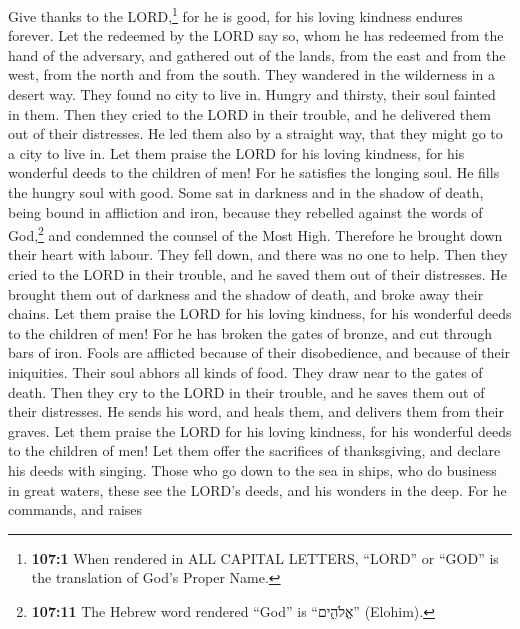  Give thanks to the LORD,\footnote{\textbf{107:1} When
  rendered in ALL CAPITAL LETTERS, ``LORD'' or ``GOD'' is the
  translation of God's Proper Name.} for he is good, for his loving
kindness endures forever.  Let the redeemed by the LORD
say so, whom he has redeemed from the hand of the adversary,
 and gathered out of the lands, from the east and from the
west, from the north and from the south.  They wandered in
the wilderness in a desert way. They found no city to live in.
 Hungry and thirsty, their soul fainted in them.
 Then they cried to the LORD in their trouble, and he
delivered them out of their distresses.  He led them also
by a straight way, that they might go to a city to live in.
 Let them praise the LORD for his loving kindness, for his
wonderful deeds to the children of men!  For he satisfies
the longing soul. He fills the hungry soul with good. 
Some sat in darkness and in the shadow of death, being bound in
affliction and iron,  because they rebelled against the
words of God,\footnote{\textbf{107:11} The Hebrew word rendered ``God''
  is ``אֱלֹהִ֑ים'' (Elohim).} and condemned the counsel of the Most
High.  Therefore he brought down their heart with labour.
They fell down, and there was no one to help.  Then they
cried to the LORD in their trouble, and he saved them out of their
distresses.  He brought them out of darkness and the
shadow of death, and broke away their chains.  Let them
praise the LORD for his loving kindness, for his wonderful deeds to the
children of men!  For he has broken the gates of bronze,
and cut through bars of iron.  Fools are afflicted
because of their disobedience, and because of their iniquities.
 Their soul abhors all kinds of food. They draw near to
the gates of death.  Then they cry to the LORD in their
trouble, and he saves them out of their distresses.  He
sends his word, and heals them, and delivers them from their graves.
 Let them praise the LORD for his loving kindness, for
his wonderful deeds to the children of men!  Let them
offer the sacrifices of thanksgiving, and declare his deeds with
singing.  Those who go down to the sea in ships, who do
business in great waters,  these see the LORD's deeds,
and his wonders in the deep.  For he commands, and raises
